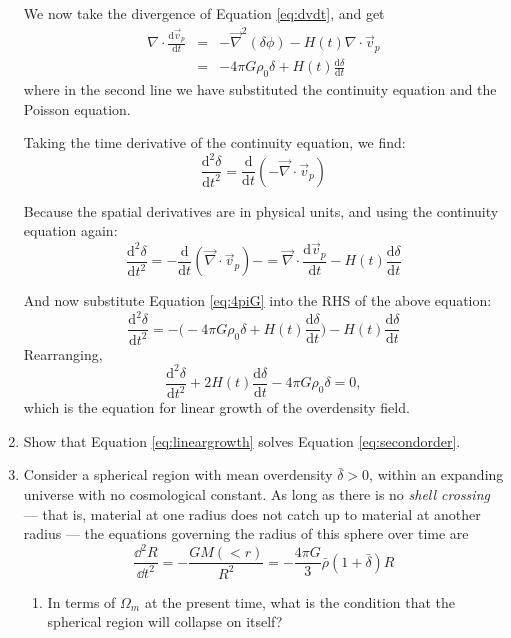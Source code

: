 \begin{enumerate}
\begin{answer}
We now take the divergence of Equation \ref{eq:dvdt}, and get
\begin{eqnarray}
\nabla \cdot \frac{\mathrm{d}\vec{v}_p}{\mathrm{d} t} &=& -\vec{\nabla}^2(\delta\phi) - H(t)\nabla \cdot \vec{v}_p \\  
 &=& -4\pi G \rho_0 \delta + H(t) \frac{\mathrm{d}\delta}{\mathrm{d} t}  \label{eq:4piG}
\end{eqnarray}
where in the second line we have substituted the continuity equation
and the Poisson equation.

Taking the time derivative of the continuity equation, we find:
\begin{equation}
\frac{\mathrm{d}^2\delta}{\mathrm{d} t^2}
= \frac{\mathrm{d}}{\mathrm{d}
t}\left(-\vec{\nabla} \cdot \vec{v}_p\right) \label{eq:d2delta}
\end{equation}

Because the spatial derivatives are in physical units, and using the
continuity equation again:
\begin{equation}
\frac{\mathrm{d}^2\delta}{\mathrm{d} t^2} =
- \frac{\mathrm{d}}{\mathrm{d}t} \left(\vec{\nabla} \cdot \vec{v}_p\right)
- = \vec{\nabla} \cdot \frac{\mathrm{d}\vec{v}_p}{\mathrm{d} t} - H(t) \frac{\mathrm{d}\delta}{\mathrm{d} t} 
\end{equation}

And now substitute Equation \ref{eq:4piG} into the RHS of the above equation:
\begin{equation}
\frac{\mathrm{d}^2\delta}{\mathrm{d} t^2} = -\Bigg(-4\pi G \rho_0 \delta + H(t) \frac{\mathrm{d}\delta}{\mathrm{d} t}\Bigg) - H(t) \frac{\mathrm{d}\delta}{\mathrm{d} t} 
\end{equation}
Rearranging,
\begin{equation}
\frac{\mathrm{d}^2\delta}{\mathrm{d} t^2} +
2H(t) \frac{\mathrm{d}\delta}{\mathrm{d} t} - 4\pi G \rho_0 \delta =
0,
\end{equation}
which is the equation for linear growth of the overdensity field.
\end{answer}

\item Show that Equation \ref{eq:lineargrowth} solves
Equation \ref{eq:secondorder}.
\item Consider a spherical region with mean overdensity $\bar\delta
>0$, within an expanding universe with no cosmological constant. As
 long as there is no {\it shell crossing} --- that is, material at one
 radius does not catch up to material at another radius --- the
 equations governing the radius of this sphere over time are
 \begin{equation}
\frac{\dd^2 R}{\dd t^2} = - \frac{GM(<r)}{R^2} = - \frac{4\pi
 G}{3} \bar\rho(1+\bar\delta) R
 \end{equation}
\begin{enumerate}
\item In terms of $\Omega_m$ at the present time, what is the
condition that the spherical region will collapse on itself?


\end{enumerate}
\end{enumerate}
